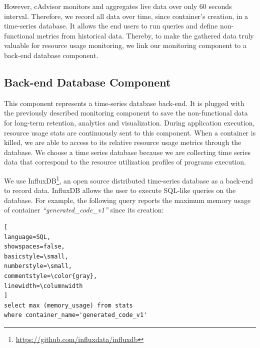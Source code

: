 However, cAdvisor monitors and aggregates live data over only 60 seconds interval. Therefore, we record all data over time, since container's creation, in a time-series database. It allows the end users to run queries and define non-functional metrics from historical data. Thereby, to make the gathered data truly valuable for resource usage monitoring, we link our monitoring component to a back-end database component. 



\subsection{Back-end Database Component}
This component represents a time-series database back-end. It is plugged with the previously described monitoring component to save the non-functional data for long-term retention, analytics and visualization. 
During application execution, resource usage stats are continuously sent to this component. When a container is killed, we are able to access to its relative resource usage metrics through the database. We choose a time series database because we are collecting time series data that correspond to the resource utilization profiles of programs execution.

We use InfluxDB\footnote{\url{https://github.com/influxdata/influxdb}}, an open source distributed time-series database as a back-end to record data. InfluxDB allows the user to execute SQL-like queries on the database. For example, the following query reports the maximum memory usage of container \textit{``generated\_code\_v1''} since its creation:

\begin{lstlisting}[
language=SQL,
showspaces=false,
basicstyle=\small,
numberstyle=\small,
commentstyle=\color{gray},
linewidth=\columnwidth
]
select max (memory_usage) from stats 
where container_name='generated_code_v1'
\end{lstlisting}
\label{listing}

